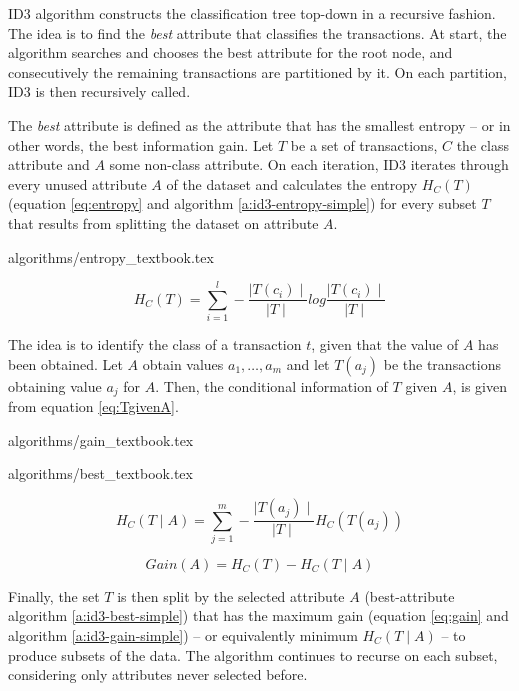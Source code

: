 ID3 algorithm constructs the classification tree top-down in a recursive fashion.
The idea is to find the \textit{best} attribute that classifies the transactions.
At start, the algorithm searches and chooses the best attribute for the root node, and consecutively the remaining transactions are partitioned by it.
On each partition, ID3 is then recursively called.

The \textit{best} attribute is defined as the attribute that has the smallest entropy -- or in other words, the best information gain.
Let $T$ be a set of transactions, $C$ the class attribute and $A$ some non-class attribute.
On each iteration, ID3 iterates through every unused attribute $A$ of the dataset and calculates the entropy $H_C(T)$ (equation \ref{eq:entropy} and algorithm \ref{a:id3-entropy-simple}) for every subset $T$ that results from splitting the dataset on attribute $A$.

{algorithms/entropy_textbook.tex}

\begin{equation}\label{eq:entropy}
  H_C(T) = \sum_{i=1}^{l} - \frac{\mid T(c_i) \mid}{\mid T \mid} log{\frac{\mid T(c_i) \mid}{\mid T \mid}}
\end{equation}

The idea is to identify the class of a transaction $t$, given that the value of $A$ has been obtained.
Let $A$ obtain values $a_1, \dots, a_m$ and let $T(a_j)$ be the transactions obtaining value $a_j$ for $A$.
Then, the conditional information of $T$ given $A$, is given from equation \ref{eq:TgivenA}.

{algorithms/gain_textbook.tex}

{algorithms/best_textbook.tex}

\begin{equation}\label{eq:TgivenA}
  H_C(T \mid A) = \sum_{j=1}^{m} - \frac{\mid T(a_j) \mid}{\mid T \mid} H_C(T(a_j))
\end{equation}

\begin{equation}\label{eq:gain}
  Gain(A) = H_C(T) - H_C(T \mid A)
\end{equation}


Finally, the set $T$ is then split by the selected attribute $A$ (best-attribute algorithm \ref{a:id3-best-simple}) that has the maximum gain (equation \ref{eq:gain} and algorithm \ref{a:id3-gain-simple}) -- or equivalently minimum $H_C(T \mid A)$ -- to produce subsets of the data.
The algorithm continues to recurse on each subset, considering only attributes never selected before.

